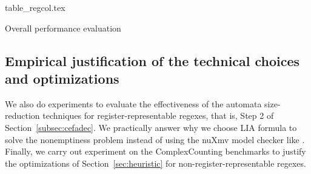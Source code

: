 \begin{table}
  \centering\vskip 0pt
    {table_regcol.tex}
    \caption{Overall performance evaluation}
  \label{fig:table_overall_eval}
\end{table}





\subsection{Empirical justification of the technical choices and optimizations}\label{subsec:size_reduction_eval}
We also do experiments to evaluate the effectiveness of the automata size-reduction techniques for register-representable regexes, that is, Step 2 of Section~\ref{subsec:cefadec}. We practically answer why we choose LIA formula to solve the nonemptiness problem instead of using the nuXmv model checker like \cite{atva2020}. Finally, we carry out experiment on the ComplexCounting benchmarks to justify the optimizations of Section~\ref{sec:heuristic} for non-register-representable regexes.
